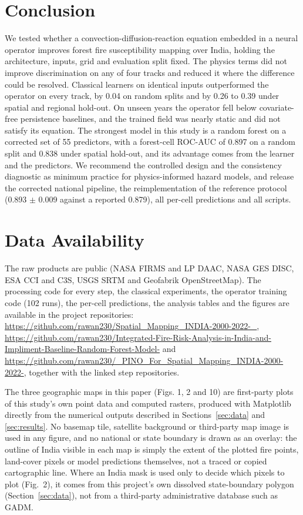 \documentclass[journal]{IEEEtran}
\newcommand{\auc}{ROC-AUC}
\begin{document}
\section{Conclusion}
\label{sec:conclusion}
We tested whether a convection-diffusion-reaction equation embedded in a neural operator improves forest fire susceptibility mapping over India, holding the architecture, inputs, grid and evaluation split fixed. The physics terms did not improve discrimination on any of four tracks and reduced it where the difference could be resolved. Classical learners on identical inputs outperformed the operator on every track, by 0.04 on random splits and by 0.26 to 0.39 under spatial and regional hold-out. On unseen years the operator fell below covariate-free persistence baselines, and the trained field was nearly static and did not satisfy its equation. The strongest model in this study is a random forest on a corrected set of 55 predictors, with a forest-cell \auc{} of 0.897 on a random split and 0.838 under spatial hold-out, and its advantage comes from the learner and the predictors. We recommend the controlled design and the consistency diagnostic as minimum practice for physics-informed hazard models, and release the corrected national pipeline, the reimplementation of the reference protocol (0.893 $\pm$ 0.009 against a reported 0.879), all per-cell predictions and all scripts.

\section*{Data Availability}
The raw products are public (NASA FIRMS and LP DAAC, NASA GES DISC, ESA CCI and C3S, USGS SRTM and Geofabrik OpenStreetMap). The processing code for every step, the classical experiments, the operator training code (102 runs), the per-cell predictions, the analysis tables and the figures are available in the project repositories: \url{https://github.com/rawan230/Spatial_Mapping_INDIA-2000-2022-_}, \url{https://github.com/rawan230/Integrated-Fire-Risk-Analysis-in-India-and-Impliment-Baseline-Random-Forest-Model-} and \url{https://github.com/rawan230/_PINO_For_Spatial_Mapping_INDIA-2000-2022-}, together with the linked step repositories.

The three geographic maps in this paper (Figs. 1, 2 and 10) are first-party plots of this study's own point data and computed rasters, produced with Matplotlib directly from the numerical outputs described in Sections~\ref{sec:data} and \ref{sec:results}. No basemap tile, satellite background or third-party map image is used in any figure, and no national or state boundary is drawn as an overlay: the outline of India visible in each map is simply the extent of the plotted fire points, land-cover pixels or model predictions themselves, not a traced or copied cartographic line. Where an India mask is used only to decide which pixels to plot (Fig.~2), it comes from this project's own dissolved state-boundary polygon (Section~\ref{sec:data}), not from a third-party administrative database such as GADM.
\end{document}
